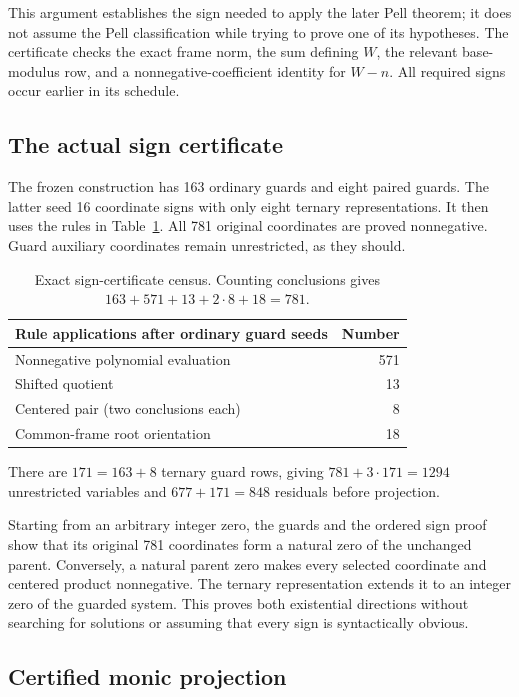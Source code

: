 \documentclass[11pt,letterpaper]{article}
\theoremstyle{definition}
\theoremstyle{remark}
\begin{document}
This argument establishes the sign needed to apply the later Pell
theorem; it does not assume the Pell classification while trying to
prove one of its hypotheses. The certificate checks the exact frame
norm, the sum defining $W$, the relevant base-modulus row, and a
nonnegative-coefficient identity for $W-n$. All required signs occur
earlier in its schedule.

\subsection{The actual sign certificate}

The frozen construction has 163 ordinary guards and eight paired guards.
The latter seed 16 coordinate signs with only eight ternary
representations. It then uses the rules in Table~\ref{tab:signs}.
All 781 original coordinates are proved nonnegative. Guard auxiliary
coordinates remain unrestricted, as they should.

\begin{table}[htbp]
\centering
\begin{tabular}{@{}lr@{}}
\toprule
Rule applications after ordinary guard seeds & Number\\
\midrule
Nonnegative polynomial evaluation & 571\\
Shifted quotient & 13\\
Centered pair (two conclusions each) & 8\\
Common-frame root orientation & 18\\
\bottomrule
\end{tabular}
\caption{Exact sign-certificate census. Counting conclusions gives
$163+571+13+2\cdot8+18=781$.}
\label{tab:signs}
\end{table}

There are $171=163+8$ ternary guard rows, giving
$781+3\cdot171=1294$ unrestricted variables and
$677+171=848$ residuals before projection.

Starting from an arbitrary integer zero, the guards and the ordered
sign proof show that its original 781 coordinates form a natural zero
of the unchanged parent. Conversely, a natural parent zero makes
every selected coordinate and centered product nonnegative.
The ternary representation extends it to an integer zero of the guarded
system. This proves both existential directions without searching for
solutions or assuming that every sign is syntactically obvious.

\subsection{Certified monic projection}
\end{document}

